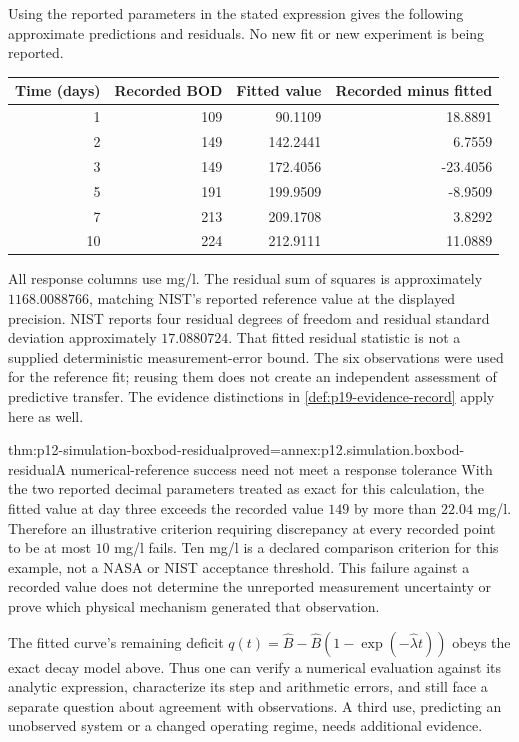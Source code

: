 Using the reported parameters in the stated expression gives the
following approximate predictions and residuals. No new fit or new
experiment is being reported.
\begin{center}
\begin{tabular}{rrrr}
\toprule
Time (days)&Recorded BOD&Fitted value&Recorded minus fitted\\
\midrule
1 &109&90.1109 &18.8891\\
2 &149&142.2441&6.7559\\
3 &149&172.4056&-23.4056\\
5 &191&199.9509&-8.9509\\
7 &213&209.1708&3.8292\\
10&224&212.9111&11.0889\\
\bottomrule
\end{tabular}
\end{center}
All response columns use mg/l. The residual sum of squares is
approximately \(1168.0088766\), matching NIST's reported reference
value at the displayed precision. NIST reports four residual degrees
of freedom and residual standard deviation approximately \(17.0880724\).
That fitted residual statistic is not a supplied deterministic
measurement-error bound. The six observations were used for the
reference fit; reusing them does not create an independent assessment
of predictive transfer. The evidence distinctions in
\cref{def:p19-evidence-record} apply here as well.

\begin{hbtheorem}{thm:p12-simulation-boxbod-residual}{proved=annex:p12.simulation.boxbod-residual}{A numerical-reference success need not meet a response tolerance}
With the two reported decimal parameters treated as exact for this
calculation, the fitted value at day three exceeds the recorded
value \(149\) by more than \(22.04\) mg/l. Therefore an illustrative
criterion requiring discrepancy at every recorded point to be at
most \(10\) mg/l fails. Ten mg/l is a declared comparison criterion
for this example, not a NASA or NIST acceptance threshold.
This failure against a recorded value does not determine the
unreported measurement uncertainty or prove which physical mechanism
generated that observation.
\end{hbtheorem}

The fitted curve's remaining deficit
\(q(t)=\widehat B-\widehat B(1-\exp(-\widehat\lambda t))\)
obeys the exact decay model above. Thus one can verify a numerical
evaluation against its analytic expression, characterize its step
and arithmetic errors, and still face a separate question about
agreement with observations. A third use, predicting an unobserved
system or a changed operating regime, needs additional evidence.

